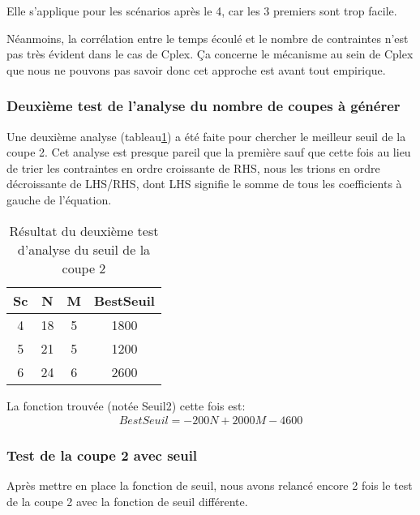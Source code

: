 \documentclass[twoside,fleqn]{EPURapport}
\begin{document}
Elle s'applique pour les scénarios après le 4, car les 3 premiers sont trop facile.

Néanmoins, la corrélation entre le temps écoulé et le nombre de contraintes n'est pas très évident dans le cas de Cplex. Ça concerne le mécanisme au sein de Cplex que nous ne pouvons pas savoir donc cet approche est avant tout empirique.

\subsubsection{Deuxième test de l'analyse du nombre de coupes à générer}
Une deuxième analyse (tableau\ref{tab_pre_2_seuil2}) a été faite pour chercher le meilleur seuil de la coupe 2. Cet analyse est presque pareil que la première sauf que cette fois au lieu de trier les contraintes en ordre croissante de RHS, nous les trions en ordre décroissante de LHS/RHS, dont LHS signifie le somme de tous les coefficients à gauche de l'équation.

\begin{table}[h]
    \centering
    \begin{tabular}{|c|c|c|c|}
    	\hline
Sc& 	N	& M	& BestSeuil\\ \hline
4 & 	18	& 5	& 1800      \\ \hline
5 & 	21	& 5	& 1200      \\ \hline
6 & 	24	& 6	& 2600     \\ \hline
    \end{tabular}
    \caption{Résultat du deuxième test d'analyse du seuil de la coupe 2}
    \label{tab_pre_2_seuil2}
\end{table}
\bigskip

La fonction trouvée (notée Seuil2) cette fois est:
\begin{align}
BestSeuil=-200N + 2000M-4600 %
\end{align}

\subsubsection{Test de la coupe 2 avec seuil }
Après mettre en place la fonction de seuil, nous avons relancé encore 2 fois le test de la coupe 2 avec la fonction de seuil différente.
\end{document}
